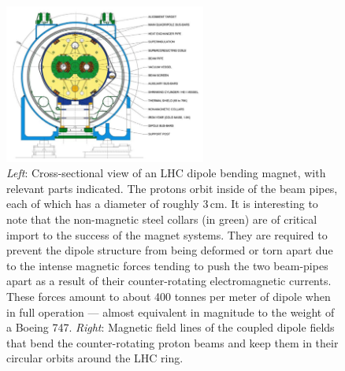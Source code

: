 \begin{figure}[!htb]
    \begin{center}
        \begin{minipage}{\textwidth}
        \includegraphics[width=0.59\textwidth]{figures/chapter2/lhc_dipole_fig3p3}
        \end{minipage}
        \caption{
            \textit{Left}: Cross-sectional view of an LHC dipole bending magnet, with relevant parts indicated.
            The protons orbit inside of the beam pipes, each of which has a diameter of roughly $3$\,cm.
            It is interesting to note that the non-magnetic steel collars (in green) are of critical import
            to the success of the magnet systems. They are required
            to prevent the dipole structure from being deformed or torn apart due to the intense magnetic forces
            tending to push the two beam-pipes apart as a result of their counter-rotating electromagnetic currents.
            These forces amount to about 400 tonnes per meter of dipole when in full operation --- almost equivalent in magnitude
            to the weight of a Boeing 747.
            \textit{Right}: Magnetic field lines of the coupled dipole fields that bend the counter-rotating proton beams
            and keep them in their circular orbits around the LHC ring.
        }
        \label{fig:lhc_dipole_xsec}
    \end{center}
\end{figure}


